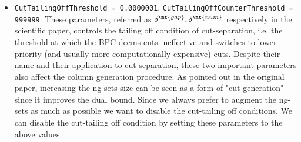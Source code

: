 \begin{itemize}
\begin{itemize}
		      \item \texttt{CutTailingOffThreshold = 0.0000001}, \texttt{CutTailingOffCounterThreshold = 999999}.
		            These parameters, referred as $\delta^\mt{gap}, \delta^\mt{num}$ respectively in the scientific paper,
		            controls the tailing off condition of cut-separation, i.e. the threshold
		            at which the BPC deems cuts ineffective and switches to lower priority
		            (and usually more computationally expensive) cuts.
		            Despite their name and their application to cut separation, these two important
		            parameters also affect the column generation procedure.
		            As pointed out in the original paper,
		            increasing the ng-sets size can be seen as a form of "cut generation"
		            since it improves the dual bound.
		            Since we always prefer to augment the ng-sets as much as possible we want
		            to disable the cut-tailing off conditions.
		            We can disable the cut-tailing off condition by setting these parameters to the above values.
	      \end{itemize}
\end{itemize}

\begin{comment}
[ About what is reduced cost fixing ]
[ Bucket arc elimination procedure = Reduced cost fixing procedure]
\textcite{sadykov2021}
VRPSolver extension includes an implementation of the pricing functor which
allows the user to define the subproblems as resource constrained shortest path
problems in graphs. The functor implements the bucket-graph based labeling
algorithm from paper [16] for solving the pricing problem, as well as the corre-
sponding bucket arc elimination procedure (i.e. reduced cost fixing procedure),
and the elementary route enumeration procedure [1]. VRPSolver extension also
implements cut separation functors for rounded cap
\end{comment}
